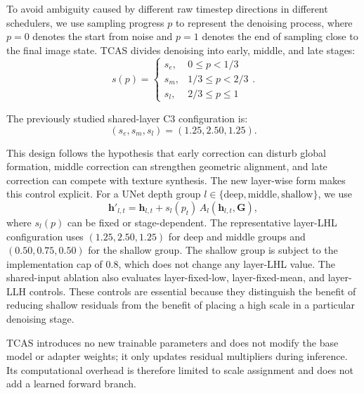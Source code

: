 \documentclass[times,twocolumn,final]{elsarticle}
\begin{document}
To avoid ambiguity caused by different raw timestep directions in different schedulers, we use sampling progress $p$ to represent the denoising process, where $p = 0$ denotes the start from noise and $p = 1$ denotes the end of sampling close to the final image state. TCAS divides denoising into early, middle, and late stages:
\begin{equation}
s(p) = \begin{cases} s_e, & 0 \leq p < 1/3 \\ s_m, & 1/3 \leq p < 2/3 \\ s_l, & 2/3 \leq p \leq 1 \end{cases}.
\label{eq:tcas}
\end{equation}

The previously studied shared-layer C3 configuration is:
\begin{equation}
(s_e, s_m, s_l) = (1.25, 2.50, 1.25).
\end{equation}

This design follows the hypothesis that early correction can disturb global
formation, middle correction can strengthen geometric alignment, and late
correction can compete with texture synthesis. The new layer-wise form makes
this control explicit. For a UNet depth group $l\in\{\text{deep},\text{middle},
\text{shallow}\}$, we use
\begin{equation}
\mathbf{h}'_{l,t}=\mathbf{h}_{l,t}+s_l(p_t)\,A_l(\mathbf{h}_{l,t},\mathbf{G}),
\label{eq:layer_tcas}
\end{equation}
where $s_l(p)$ can be fixed or stage-dependent. The representative layer-LHL
configuration uses $(1.25,2.50,1.25)$ for deep and middle groups and
$(0.50,0.75,0.50)$ for the shallow group. The shallow group is subject to the
implementation cap of $0.8$, which does not change any layer-LHL value.
The shared-input ablation also evaluates layer-fixed-low, layer-fixed-mean,
and layer-LLH controls. These controls are essential because they distinguish
the benefit of reducing shallow residuals from the benefit of placing a high
scale in a particular denoising stage.

TCAS introduces no new trainable parameters and does not modify the base model
or adapter weights; it only updates residual multipliers during inference.
Its computational overhead is therefore limited to scale assignment and does
not add a learned forward branch.
\end{document}
